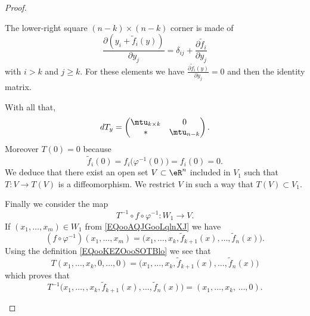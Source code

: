 \begin{proof}
\begin{subproof}
\begin{subproof}
\begin{itemize}
                    The lower-right square \( (n-k)\times (n-k)\) corner is made of
                    \begin{equation}
                        \frac{ \partial (y_i+\tilde f_i(y)) }{ \partial y_j }=\delta_{ij}+\frac{ \partial \tilde f_i }{ \partial y_j }
                    \end{equation}
                    with \( i>k\) and \( j\geq k\). For these elements we have \( \frac{ \partial \tilde f_i(y) }{ \partial y_j }=0\) and then the identity matrix.
                    \end{itemize}
                    With all that,
                    \begin{equation}
                        dT_y=\begin{pmatrix}
                            \mtu_{k\times k}    &   0    \\ 
                            *    &   \mtu_{n-k}    
                        \end{pmatrix}.
                    \end{equation}
                    Moreover \( T(0)=0\) because
                    \begin{equation}
                        \tilde f_i(0)=f_i\big( \varphi^{-1}(0) \big)=f_i(0)=0.
                    \end{equation}
                    We deduce that there exist an open set \( V\subset \eR^n\) included in \( V_1\) such that \( T\colon V\to T(V)\) is a diffeomorphism. We restrict \( V\) in such a way that \( T(V)\subset V_1\).


                    Finally we consider the map
                    \begin{equation}
                        T^{-1}\circ f\circ \varphi^{-1}\colon W_1 \to V.
                    \end{equation}
                    If \( (x_1,\ldots, x_m)\in W_1\) from \eqref{EQooAQJGooLqlnXJ} we have
                    \begin{equation}
                        (f\circ \varphi^{-1})(x_1,\ldots, x_m)=\big( x_1,\ldots, x_k,\tilde f_{k+1}(x),\ldots, \tilde f_n(x) \big).
                    \end{equation}
                    Using the definition \eqref{EQooKEZOooSOTBlo} we see that
                    \begin{equation}
                        T(x_1,\ldots, x_k,0,\ldots, 0)=\big( x_1,\ldots, x_k,\tilde f_{k+1}(x),\ldots, \tilde f_n(x) \big)
                    \end{equation}
                    which proves that
                    \begin{equation}
                        T^{-1}\big( x_1,\ldots, ,x_k,\tilde f_{k+1}(x),\ldots, \tilde f_n(x) \big)=(x_1,\ldots, x_k,\,\ldots, 0).
                    \end{equation}
            \end{subproof}


\end{subproof}
\end{proof}
